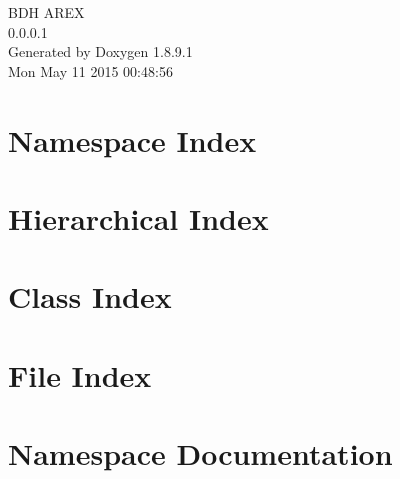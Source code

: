 \documentclass[twoside]{book}
\newcommand{\+}{\discretionary{\mbox{\scriptsize$\hookleftarrow$}}{}{}}
\newcommand{\clearemptydoublepage}{%
  \newpage{\pagestyle{empty}\cleardoublepage}%
}
\begin{document}
\hypersetup{pageanchor=false,
             bookmarks=true,
             bookmarksnumbered=true,
             pdfencoding=unicode
            }
\begin{titlepage}
\vspace*{7cm}
\begin{center}%
{\Large B\+D\+H A\+R\+E\+X \\[1ex]\large 0.\+0.\+0.\+1 }\\
\vspace*{1cm}
{\large Generated by Doxygen 1.8.9.1}\\
\vspace*{0.5cm}
{\small Mon May 11 2015 00:48:56}\\
\end{center}
\end{titlepage}
\clearemptydoublepage
\tableofcontents
\clearemptydoublepage
{}
\hypersetup{pageanchor=true}

\chapter{Namespace Index}

\chapter{Hierarchical Index}

\chapter{Class Index}

\chapter{File Index}

\chapter{Namespace Documentation}


\end{document}

